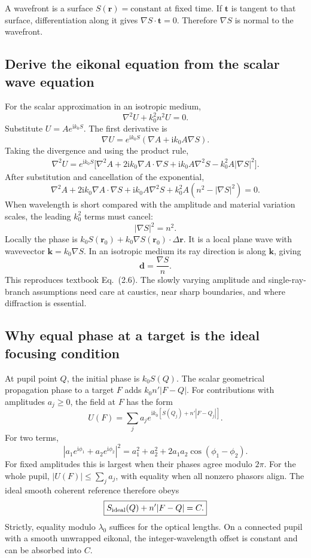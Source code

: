 \documentclass[11pt,a4paper]{article}
\numberwithin{equation}{section}
\newcommand{\ii}{\mathrm{i}}
\newcommand{\vct}[1]{\bm{#1}}
\begin{document}
A wavefront is a surface $S(\vct r)=\text{constant}$ at fixed time.
If $\vct t$ is tangent to that surface, differentiation along it gives
$\nabla S\cdot\vct t=0$. Therefore $\nabla S$ is normal to the wavefront.

\subsection{Derive the eikonal equation from the scalar wave equation}
For the scalar approximation in an isotropic medium,
\[
 \nabla^2U+k_0^2n^2U=0.
\]
Substitute $U=Ae^{\ii k_0S}$. The first derivative is
\[
 \nabla U=e^{\ii k_0S}\left(\nabla A+\ii k_0A\nabla S\right).
\]
Taking the divergence and using the product rule,
\begin{align}
 \nabla^2U=e^{\ii k_0S}\big[
 \nabla^2A+2\ii k_0\nabla A\cdot\nabla S
 +\ii k_0A\nabla^2S-k_0^2A|\nabla S|^2\big].
\end{align}
After substitution and cancellation of the exponential,
\begin{equation}
 \nabla^2A+2\ii k_0\nabla A\cdot\nabla S+\ii k_0A\nabla^2S
 +k_0^2A(n^2-|\nabla S|^2)=0.
\end{equation}
When wavelength is short compared with the amplitude and material variation
scales, the leading $k_0^2$ terms must cancel:
\begin{equation}
 \boxed{|\nabla S|^2=n^2.}
 \label{eq:eikonal}
\end{equation}
Locally the phase is
$k_0S(\vct r_0)+k_0\nabla S(\vct r_0)\cdot\Delta\vct r$.
It is a local plane wave with wavevector $\vct k=k_0\nabla S$.
In an isotropic medium its ray direction is along $\vct k$, giving
\begin{equation}
 \boxed{\vct d=\frac{\nabla S}{n}.}
 \label{eq:ray-eikonal}
\end{equation}
This reproduces textbook Eq.~(2.6).
The slowly varying amplitude and single-ray-branch assumptions need care at
caustics, near sharp boundaries, and where diffraction is essential.

\subsection{Why equal phase at a target is the ideal focusing condition}
At pupil point $Q$, the initial phase is $k_0S(Q)$.
The scalar geometrical propagation phase to a target $F$ adds
$k_0n'|F-Q|$. For contributions with amplitudes $a_j\geq0$, the field at $F$
has the form
\[
 U(F)=\sum_j a_j e^{\ii k_0[S(Q_j)+n'|F-Q_j|]}.
\]
For two terms,
\[
 |a_1e^{\ii\phi_1}+a_2e^{\ii\phi_2}|^2
 =a_1^2+a_2^2+2a_1a_2\cos(\phi_1-\phi_2).
\]
For fixed amplitudes this is largest when their phases agree modulo $2\pi$.
For the whole pupil, $|U(F)|\leq\sum_j a_j$, with equality when all
nonzero phasors align. The ideal smooth coherent reference therefore obeys
\begin{equation}
 \boxed{S_{\rm ideal}(Q)+n'|F-Q|=C.}
 \label{eq:constant-focus}
\end{equation}
Strictly, equality modulo $\lambda_0$ suffices for the optical lengths.
On a connected pupil with a smooth unwrapped eikonal, the integer-wavelength
offset is constant and can be absorbed into $C$.
\end{document}
